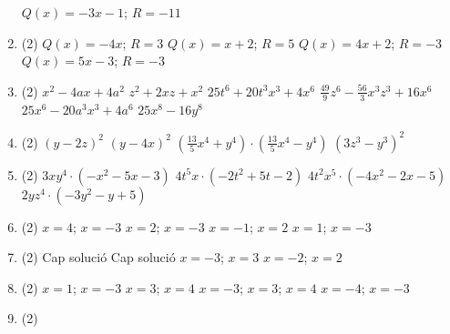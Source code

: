 \documentclass[a4paper]{article}
\begin{document}
\begin{enumerate}
\begin{tasks}
        \task $Q(x)=-3 x -1$; $R=-11$
      \end{tasks}
      \item
      \begin{tasks}(2)
        \task $Q(x)=-4 x $; $R=3$
        \task $Q(x)= x + 2$; $R=5$
        \task $Q(x)=4 x + 2$; $R=-3$
        \task $Q(x)=5 x -3$; $R=-3$
      \end{tasks}
      \item
      \begin{tasks}(2)
        \task $x^{2} -4 a x +4 a^{2}$
        \task $z^{2} +2 x z +x^{2}$
        \task $25 t^{6} +20 t^{3} x^{3} +4 x^{6}$
        \task $\frac{49}{9} z^{6} -\frac{56}{3} x^{3} z^{3} +16 x^{6}$
        \task $25 x^{6} -20 a^{3} x^{3} +4 a^{6}$
        \task $25 x^{8} -16 y^{8}$
      \end{tasks}
      \item
      \begin{tasks}(2)
        \task $\left(y - 2 z\right)^2$
        \task $\left(y - 4 x\right)^2$
        \task $\left(\frac{13}{5} x^{4} + y^{4}\right) \cdot \left(\frac{13}{5} x^{4} - y^{4}\right)$
        \task $\left(3 z^{3} - y^{3}\right)^2$
      \end{tasks}
      \item
      \begin{tasks}(2)
        \task $3 x y^{4} \cdot \left(-x^{2} -5 x -3\right)$
        \task $4 t^{5} x \cdot \left(-2 t^{2} +5 t -2\right)$
        \task $4 t^{2} x^{5} \cdot \left(-4 x^{2} -2 x -5\right)$
        \task $2 y z^{4} \cdot \left(-3 y^{2} -y +5\right)$
      \end{tasks}
      \item
      \begin{tasks}(2)
        \task $x=4$; $x=-3$
        \task $x=2$; $x=-3$
        \task $x=-1$; $x=2$
        \task $x=1$; $x=-3$
      \end{tasks}
      \item
      \begin{tasks}(2)
        \task Cap solució
        \task Cap solució
        \task $x=-3$; $x=3$
        \task $x=-2$; $x=2$
      \end{tasks}
      \item
      \begin{tasks}(2)
        \task $x=1$; $x=-3$
        \task $x=3$; $x=4$
        \task $x=-3$; $x=3$; $x=4$
        \task $x=-4$; $x=-3$
      \end{tasks}
      \item
      \begin{tasks}(2)

\end{tasks}
\end{enumerate}
\end{document}
